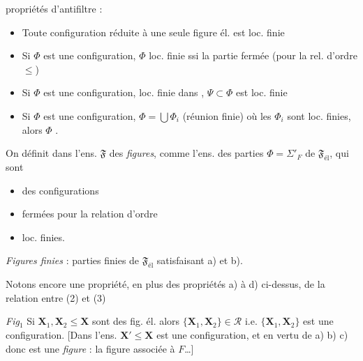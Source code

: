 \documentclass[11pt,a4paper]{article}
\begin{document}
 propriétés d'antifiltre :
\begin{itemize}
  \item[a)] Toute configuration réduite à une seule figure él. est loc. finie
  \item[b)] Si $\Phi$ est une configuration, $\Phi$ loc. finie ssi la \struck{\ill{}} partie fermée (pour la rel. d'ordre $\leq$) \ill{}
  \item[c)] Si $\Phi$ est une configuration, \struck{$\Phi$, $\Psi$} loc. finie dans ,  $\Psi \subset \Phi$ est loc. finie
  \item[d)] Si $\Phi$ est une configuration, $\Phi = \bigcup \Phi_i$ (réunion finie) où les $\Phi_i$ sont loc. finies, alors $\Phi$ .
\end{itemize}

On définit dans l'ens. $\mathfrak{F}$ des \emph{figures}, comme l'ens. des parties $\Phi = \Sigma'_F$ de $\mathfrak{F}_{\mathrm{él}}$, qui sont
\begin{itemize}
  \item[a)] des configurations
  \item[b)] fermées pour la relation d'ordre
  \item[c)] loc. finies.
\end{itemize}
\emph{Figures finies} : parties finies de $\mathfrak{F}_{\mathrm{él}}$ satisfaisant a) et b).

Notons encore une propriété, en plus des propriétés a) à d)  ci-dessus, de la relation entre (2) et (3)


\emph{Fig$_1$} Si $\mathbf{X}_1, \mathbf{X}_2 \leq \mathbf{X}$ sont des fig. él. alors $\{\mathbf{X}_1, \mathbf{X}_2\} \in \mathcal{R}$ i.e. $\{\mathbf{X}_1, \mathbf{X}_2\}$ est une configuration. [Dans l'ens.  $\mathbf{X}' \leq \mathbf{X}$ est une configuration, et en vertu de a) b) c) donc est une \emph{figure} : la figure associée à $F$\ldots]
\end{document}
